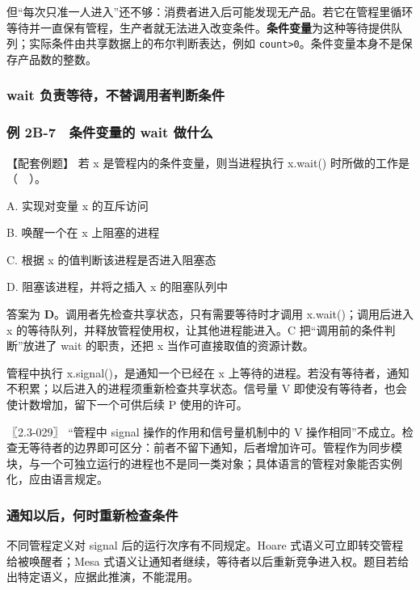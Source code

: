但``每次只准一人进入''还不够：消费者进入后可能发现无产品。若它在管程里循环等待并一直保有管程，生产者就无法进入改变条件。\textbf{条件变量}为这种等待提供队列；实际条件由共享数据上的布尔判断表达，例如 \texttt{count>\allowbreak{}0}。条件变量本身不是保存产品数的整数。

\subsubsection{wait 负责等待，不替调用者判断条件}\label{OS02-auto-20}

\subsubsection{例 2B-7　条件变量的 wait 做什么}\label{OS02-ex-2018}

\begin{example}[配套例题]

【配套例题】 若 x 是管程内的条件变量，则当进程执行 x.wait() 时所做的工作是（　）。

A. 实现对变量 x 的互斥访问

B. 唤醒一个在 x 上阻塞的进程

C. 根据 x 的值判断该进程是否进入阻塞态

D. 阻塞该进程，并将之插入 x 的阻塞队列中

\end{example}

答案为 \textbf{D}。调用者先检查共享状态，只有需要等待时才调用 x.wait()；调用后进入 x 的等待队列，并释放管程使用权，让其他进程能进入。C 把``调用前的条件判断''放进了 wait 的职责，还把 x 当作可直接取值的资源计数。

管程中执行 x.signal()，是通知一个已经在 x 上等待的进程。若没有等待者，通知不积累；以后进入的进程须重新检查共享状态。信号量 V 即使没有等待者，也会使计数增加，留下一个可供后续 P 使用的许可。

〖2.3-029〗 ``管程中 signal 操作的作用和信号量机制中的 V 操作相同''不成立。检查无等待者的边界即可区分：前者不留下通知，后者增加许可。管程作为同步模块，与一个可独立运行的进程也不是同一类对象；具体语言的管程对象能否实例化，应由语言规定。

\subsubsection{通知以后，何时重新检查条件}\label{OS02-auto-21}

不同管程定义对 signal 后的运行次序有不同规定。Hoare 式语义可立即转交管程给被唤醒者；Mesa 式语义让通知者继续，等待者以后重新竞争进入权。题目若给出特定语义，应据此推演，不能混用。

